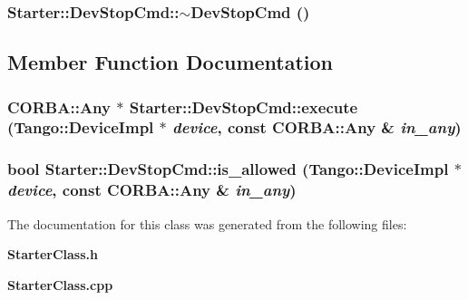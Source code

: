 \subsubsection{\setlength{\rightskip}{0pt plus 5cm}Starter::Dev\-Stop\-Cmd::$\sim$Dev\-Stop\-Cmd ()\hspace{0.3cm}{\tt  [inline]}}\label{classStarter_1_1DevStopCmd_a2}




\subsection{Member Function Documentation}
\subsubsection{\setlength{\rightskip}{0pt plus 5cm}CORBA::Any $\ast$ Starter::Dev\-Stop\-Cmd::execute (Tango::Device\-Impl $\ast$ {\em device}, const CORBA::Any \& {\em in\_\-any})\hspace{0.3cm}{\tt  [virtual]}}\label{classStarter_1_1DevStopCmd_a4}


\subsubsection{\setlength{\rightskip}{0pt plus 5cm}bool Starter::Dev\-Stop\-Cmd::is\_\-allowed (Tango::Device\-Impl $\ast$ {\em device}, const CORBA::Any \& {\em in\_\-any})\hspace{0.3cm}{\tt  [virtual]}}\label{classStarter_1_1DevStopCmd_a3}




The documentation for this class was generated from the following files:\begin{CompactItemize}
\item 
{\bf Starter\-Class.h}\item 
{\bf Starter\-Class.cpp}\end{CompactItemize}
